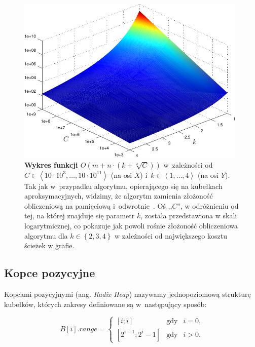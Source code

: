 \begin{figure}[!htbp]
	\centering
	\null\hfill
	\includegraphics[width=0.98\textwidth]{Chapter_II/K-LEVEL-BUCKETS-Other/kLevel3DPlot_psfrag.pdf}
	\hfill\null
	\caption{
		\textbf{Wykres funkcji $O \left( m + n \cdot \left( k + \sqrt[k]{C} \right) \right)$}
		w~zależności od $C \in \left\langle 10 \cdot 10^{3}, \dots, 10 \cdot 10^{11} \right\rangle$ (na osi $X$) i~$k \in \left\langle 1, \dots, 4 \right\rangle$ (na osi $Y$).
		Tak jak w~przypadku algorytmu, opierającego się na kubełkach aproksymacyjnych, widzimy, że algorytm zamienia złożoność obliczeniową na pamięciową i~odwrotnie~\cite[$7.1$--$7.4$]{NetOpt}.
		Oś ,,$C$'', w odróżnieniu od tej, na której znajduje się parametr $k$, została przedstawiona w skali logarytmicznej, co pokazuje jak powoli rośnie złożoność obliczeniowa algorytmu dla $k \in \left\{ 2, 3, 4\right\}$ w zależności od największego kosztu ścieżek w grafie.
	}
	\label{fig:plotKLevelBucketsComplexity}
\end{figure}



\subsection{Kopce pozycyjne}



Kopcami pozycyjnymi (ang. \textit{Radix Heap}) nazywamy jednopoziomową strukturę kubełków, których zakresy definiowane są w~następujący sposób:

\begin{equation}\label{eq:radixHeapBucketsRange}
	B \left[ i \right].range = \left\{
		\begin{matrix}
			\left[ i; i \right ]& \textrm{gdy} & i = 0\textrm{,} \\ 
			\left[ 2^{i-1} ; 2^{i} - 1 \right ]& \textrm{gdy} & i > 0\textrm{.}
		\end{matrix}
	\right.
\end{equation}


